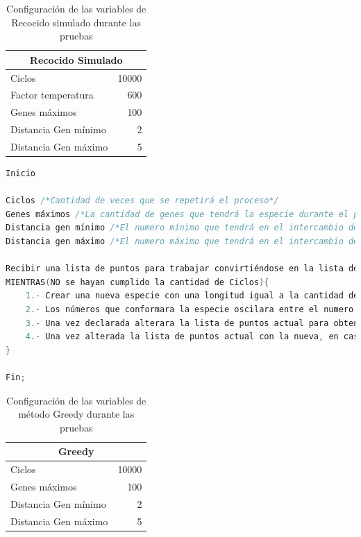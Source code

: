 \begin{table}[hbtp]
 \centering 
  \small
   \setlength{\parskip}{1mm}
	\begin{tabular}{ | l | r | }
        \hline\multicolumn{2}{|c|}{ \rowcolor[gray]{0.75}Recocido Simulado} \\\hline
			\cellcolor[gray]{0.9}Ciclos & 10000 \\\hline
			\cellcolor[gray]{0.9}Factor temperatura & 600 \\\hline
    		\cellcolor[gray]{0.9}Genes máximos & 100 \\\hline
			\cellcolor[gray]{0.9}Distancia Gen mínimo & 2 \\\hline
			\cellcolor[gray]{0.9}Distancia Gen máximo & 5 \\\hline
    \end{tabular}
    \caption{Configuración de las variables de Recocido simulado durante las pruebas}
    \label{table:ConfiguracionRS.tsp}
\end{table}


\begin{lstlisting}[language=C++, caption=Algoritmo Greedy aplicado en las pruebas, label=lst:AlgoritmoGreedyPruebas]
Inicio

Ciclos /*Cantidad de veces que se repetirá el proceso*/
Genes máximos /*La cantidad de genes que tendrá la especie durante el proceso de búsqueda local*/
Distancia gen mínimo /*El numero mínimo que tendrá en el intercambio de posiciones*/
Distancia gen máximo /*El numero máximo que tendrá en el intercambio de posiciones*/

Recibir una lista de puntos para trabajar convirtiéndose en la lista de puntos actual.
MIENTRAS(NO se hayan cumplido la cantidad de Ciclos){
	1.- Crear una nueva especie con una longitud igual a la cantidad de genes máximos
	2.- Los números que conformara la especie oscilara entre el numero mínimo y máximo declarados anteriormente
	3.- Una vez declarada alterara la lista de puntos actual para obtener una lista nueva.
	4.- Una vez alterada la lista de puntos actual con la nueva, en caso de obtener un mejor resultado esta lista es sustituida por la nueva
}

Fin;
\end{lstlisting}

\begin{table}[hbtp]
 \centering 
  \small
	\begin{tabular}{ | l | r |}

	    \multicolumn{2}{|c|}{ \rowcolor[gray]{0.75}Greedy} \\\hline
			\cellcolor[gray]{0.9}Ciclos & 10000 \\\hline
			\cellcolor[gray]{0.9}Genes máximos & 100 \\\hline
			\cellcolor[gray]{0.9}Distancia Gen mínimo & 2 \\\hline
			\cellcolor[gray]{0.9}Distancia Gen máximo & 5 \\\hline
    \end{tabular}
    \caption{Configuración de las variables de método Greedy durante las pruebas}
    \label{table:ConfiguracionGR.tsp}
\end{table}

